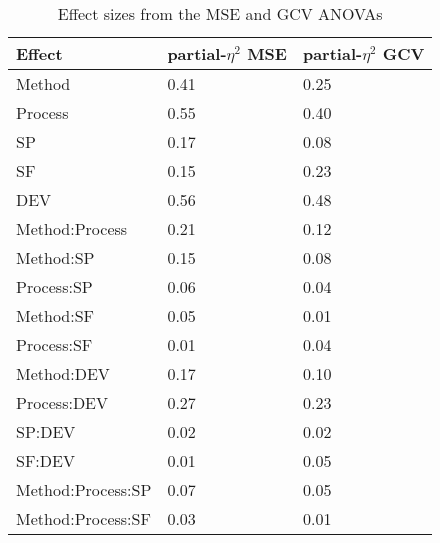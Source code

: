 \documentclass[man, floatsintext]{apa7}
\begin{document}
\begin{table}[tbp] %

  \begin{center}
    \begin{threeparttable}
      \caption{Effect sizes from the MSE and GCV ANOVAs}
      \label{tab:peta}
      \begin{tabular}{lll}
        \toprule
        Effect                & \multicolumn{1}{c}{partial-$\eta^2$ MSE} &
        \multicolumn{1}{c}{partial-$\eta^2$ GCV}
        \\
        \midrule
        Method                & 0.41                                     & 0.25
        \\
        Process               & 0.55                                     & 0.40
        \\
        SP                    & 0.17                                     & 0.08
        \\
        SF                    & 0.15                                     & 0.23
        \\
        DEV                   & 0.56                                     & 0.48
        \\
        Method:Process        & 0.21                                     & 0.12
        \\
        Method:SP             & 0.15                                     & 0.08
        \\
        Process:SP            & 0.06                                     & 0.04
        \\
        Method:SF             & 0.05                                     & 0.01
        \\
        Process:SF            & 0.01                                     & 0.04
        \\
        Method:DEV            & 0.17                                     & 0.10
        \\
        Process:DEV           & 0.27                                     & 0.23
        \\
        SP:DEV                & 0.02                                     & 0.02
        \\
        SF:DEV                & 0.01                                     & 0.05
        \\
        Method:Process:SP     & 0.07                                     & 0.05
        \\
        Method:Process:SF     & 0.03                                     & 0.01

\end{tabular}
\end{threeparttable}
\end{center}
\end{table}
\end{document}
